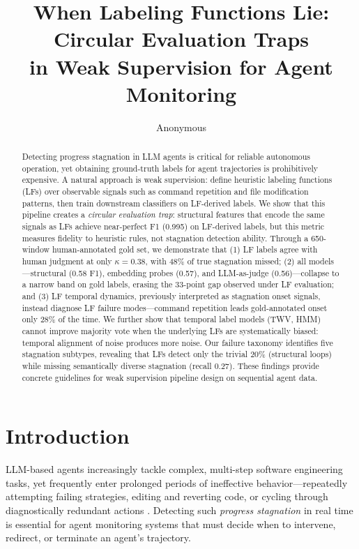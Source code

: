 \documentclass[11pt]{article}
\title{When Labeling Functions Lie: Circular Evaluation Traps \\ in Weak Supervision for Agent Monitoring}
\author{Anonymous}
\begin{document}
\maketitle

\begin{abstract}
Detecting progress stagnation in LLM agents is critical for reliable autonomous operation, yet obtaining ground-truth labels for agent trajectories is prohibitively expensive. A natural approach is weak supervision: define heuristic labeling functions (LFs) over observable signals such as command repetition and file modification patterns, then train downstream classifiers on LF-derived labels. We show that this pipeline creates a \emph{circular evaluation trap}: structural features that encode the same signals as LFs achieve near-perfect F1 (0.995) on LF-derived labels, but this metric measures fidelity to heuristic rules, not stagnation detection ability. Through a 650-window human-annotated gold set, we demonstrate that (1) LF labels agree with human judgment at only $\kappa{=}0.38$, with 48\% of true stagnation missed; (2) all models---structural (0.58 F1), embedding probes (0.57), and LLM-as-judge (0.56)---collapse to a narrow band on gold labels, erasing the 33-point gap observed under LF evaluation; and (3) LF temporal dynamics, previously interpreted as stagnation onset signals, instead diagnose LF failure modes---command repetition leads gold-annotated onset only 28\% of the time. We further show that temporal label models (TWV, HMM) cannot improve majority vote when the underlying LFs are systematically biased: temporal alignment of noise produces more noise. Our failure taxonomy identifies five stagnation subtypes, revealing that LFs detect only the trivial 20\% (structural loops) while missing semantically diverse stagnation (recall 0.27). These findings provide concrete guidelines for weak supervision pipeline design on sequential agent data.
\end{abstract}

\section{Introduction}

LLM-based agents increasingly tackle complex, multi-step software engineering tasks, yet frequently enter prolonged periods of ineffective behavior---repeatedly attempting failing strategies, editing and reverting code, or cycling through diagnostically redundant actions \cite{jimenez2024swebench}. Detecting such \emph{progress stagnation} in real time is essential for agent monitoring systems that must decide when to intervene, redirect, or terminate an agent's trajectory.
\end{document}
